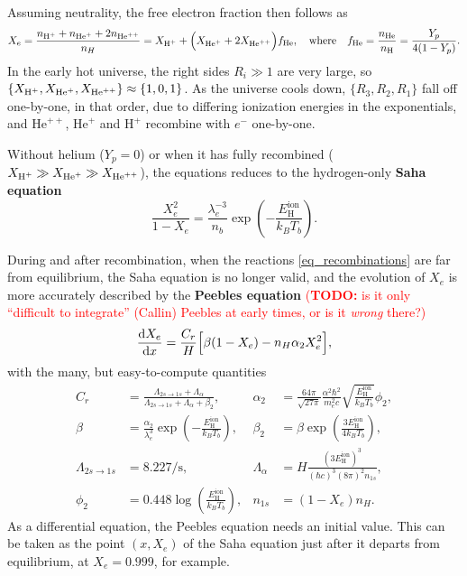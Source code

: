 \documentclass[10pt,a4paper]{article}
\newcommand\TODO[1]{\textcolor{red}{(\textbf{TODO:} #1)}}
\begin{document}
Assuming neutrality, the free electron fraction then follows as
\begin{equation}
    X_e = \frac{n_{\text{H}^+} + n_{\text{He}^+} + 2 n_{\text{He}^{++}}}{n_H} = X_{\text{H}^+} +  \Big( X_{\text{He}^+} + 2 X_{\text{He}^{++}} \Big) f_\text{He}, \quad \text{where} \quad f_\text{He} = \frac{n_\text{He}}{n_\text{H}} = \frac{Y_p}{4(1-Y_p)}.
\label{eq_Saha_H_He_Xe}
\end{equation}
In the early hot universe, the right sides $R_i \gg 1$ are very large, so $\{X_{\text{H}^+},X_{\text{He}^+},X_{\text{He}^{++}}\} \approx \{1,0,1\}$.
As the universe cools down, $\{R_3, R_2, R_1\}$ fall off one-by-one, in that order, due to differing ionization energies in the exponentials,
and $\text{He}^{++}$, $\text{He}^+$ and $\text{H}^+$ recombine with $e^-$ one-by-one.

Without helium ($Y_p=0$) or when it has fully recombined ($X_{\text{H}^+} \gg X_{\text{He}^+} \gg X_{\text{He}^{++}}$),
the equations reduces to the hydrogen-only \textbf{Saha equation}
\begin{equation}
	\frac{X_e^2}{1-X_e} = \frac{\lambda_e^{-3}}{n_b} \exp \left( -\frac{E^\text{ion}_\text{H}}{k_B T_b} \right).
\label{eq_saha_H}
\end{equation}

During and after recombination, when the reactions \eqref{eq_recombinations} are far from equilibrium,
the Saha equation is no longer valid,
and the evolution of $X_e$ is more accurately described by the \textbf{Peebles equation}
\TODO{is it only ``difficult to integrate'' (Callin) Peebles at early times, or is it \emph{wrong} there?}
\begin{equation}
	\odv{X_e}{x} = \frac{C_r}{H} \Big[ \beta (1-X_e) - n_H \alpha_2 X_e^2 \Big],
\label{eq_Peebles}
\end{equation}
with the many, but easy-to-compute quantities
\begin{align*}
	C_r &= \frac{\Lambda_{2s \rightarrow 1s} + \Lambda_\alpha}{\Lambda_{2s \rightarrow 1s} + \Lambda_\alpha + \beta_2}, &
	\alpha_2 &= \frac{64 \pi}{\sqrt{27 \pi}} \frac{\alpha^2 \hbar^2}{m_e^2 c} \sqrt{\frac{E^\text{ion}_\text{H}}{k_B T_b}} \phi_2, \\
	\beta &= \frac{\alpha_2}{\lambda_e^3} \exp \left(-\frac{E^\text{ion}_\text{H}}{k_B T_b}\right), &
	\beta_2 &= \beta \exp \left(\frac{3 E^\text{ion}_\text{H}}{4 k_B T_b}\right), \\
	\Lambda_{2s \rightarrow 1s} &= 8.227 / \mathrm{s}, &
	\Lambda_\alpha &= H \frac{(3 E^\text{ion}_{\text{H}})^3}{(\hbar c)^3 (8 \pi)^2 n_{1s}}, \\
	\phi_2 &= 0.448 \log \left( \frac{E^\text{ion}_\text{H}}{k_B T_b} \right), &
	n_{1s} &= (1-X_e) n_H.
\end{align*}
As a differential equation, the Peebles equation needs an initial value.
This can be taken as the point $(x, X_e)$ of the Saha equation just after it departs from equilibrium, at $X_e = 0.999$, for example.
\end{document}
